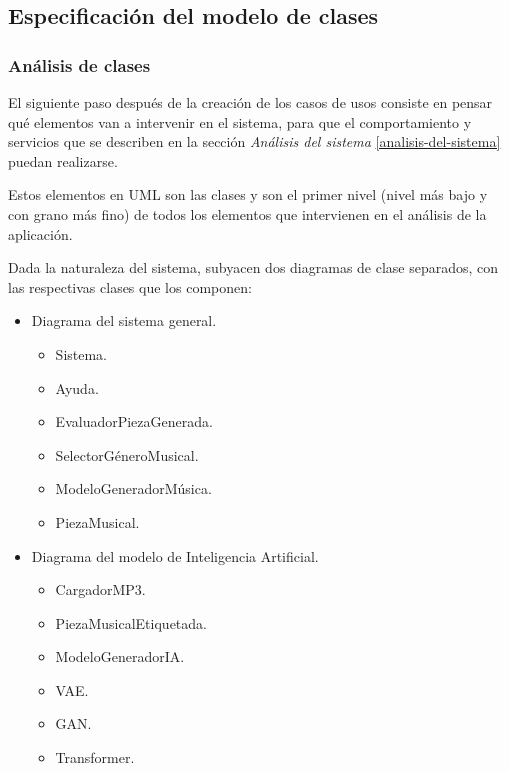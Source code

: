 
\subsection{Especificación del modelo de clases}
\label{especificacion-modelo-clases}
\subsubsection{Análisis de clases}

El siguiente paso después de la creación de los casos de usos consiste en pensar qué elementos van a intervenir en el sistema, para que el comportamiento y servicios que se describen en la sección \emph{Análisis del sistema} \ref{analisis-del-sistema} puedan realizarse.

Estos elementos en UML son las clases y son el primer nivel (nivel más bajo y con grano más fino) de todos los elementos que intervienen en el análisis de la aplicación.

Dada la naturaleza del sistema, subyacen dos diagramas de clase separados, con las respectivas clases que los componen:
\begin{itemize}
    \item Diagrama del sistema general.
    \begin{itemize}
        \item Sistema.
        \item Ayuda.
        \item EvaluadorPiezaGenerada.
        \item SelectorGéneroMusical.
        \item ModeloGeneradorMúsica.
        \item PiezaMusical.
    \end{itemize}
    \item Diagrama del modelo de Inteligencia Artificial.
    \begin{itemize}
        \item CargadorMP3.
        \item PiezaMusicalEtiquetada.
        \item ModeloGeneradorIA.
        \item VAE.
        \item GAN.
        \item Transformer.
    \end{itemize}
\end{itemize}

